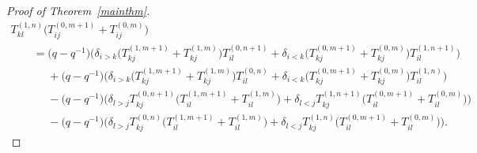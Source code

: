 \documentclass[11pt]{article}
\numberwithin{theorem}{section}
\numberwithin{proposition}{section}
\numberwithin{lemma}{section}
\numberwithin{corollary}{section}
\numberwithin{definition}{section}
\numberwithin{example}{section}
\numberwithin{remark}{section}
\numberwithin{note}{section}
\numberwithin{equation}{section}
\begin{document}
\begin{proof}[Proof of Theorem~\ref{mainthm}]
\begin{gather*}
T_{kl}^{(1,n)} \big(T_{ij}^{(0,m+1)} + T_{ij}^{(0,m)}\big)
\\
\qquad
  = \big(q-q^{-1}\big) \Big(\delta_{i>k} \big(T_{kj}^{(1,m+1)} + T_{kj}^{(1,m)}\big) T_{il}^{(0,n+1)} + \delta_{i<k}
\big(T_{kj}^{(0,m+1)} + T_{kj}^{(0,m)}\big) T_{il}^{(1,n+1)} \Big)
\\
\qquad\phantom{=}{}
+ \big(q-q^{-1}\big) \Big(\delta_{i>k} \big(T_{kj}^{(1,m+1)} + T_{kj}^{(1,m)}\big) T_{il}^{(0,n)} + \delta_{i<k}
\big(T_{kj}^{(0,m+1)} + T_{kj}^{(0,m)}\big) T_{il}^{(1,n)}\Big)
\\
\qquad\phantom{=}{}
- \big(q-q^{-1}\big) \Big(\delta_{l>j} T_{kj}^{(0,n+1)} \big(T_{il}^{(1,m+1)} + T_{il}^{(1,m)}\big) + \delta_{l<j}
T_{kj}^{(1,n+1)} \big(T_{il}^{(0,m+1)} + T_{il}^{(0,m)}\big) \Big)
\\
\qquad\phantom{=}{}
- \big(q-q^{-1}\big) \Big(\delta_{l>j} T_{kj}^{(0,n)} \big(T_{il}^{(1,m+1)} + T_{il}^{(1,m)}\big) + \delta_{l<j} T_{kj}^{(1,n)}
\big(T_{il}^{(0,m+1)} + T_{il}^{(0,m)}\big) \Big).
\end{gather*}


\end{proof}
\end{document}
